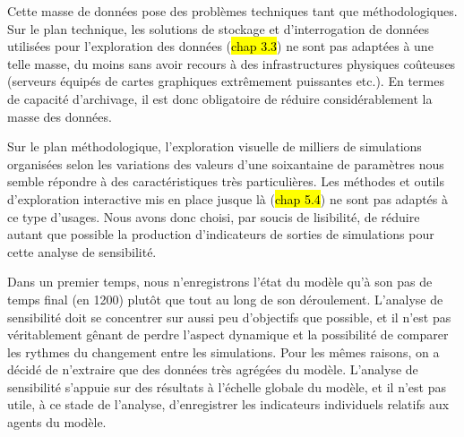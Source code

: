 Cette masse de données pose des problèmes techniques tant que méthodologiques.
Sur le plan technique, les solutions de stockage et d'interrogation de données utilisées pour l'exploration des données (\hl{chap 3.3}) ne sont pas adaptées à une telle masse, du moins sans avoir recours à des infrastructures physiques coûteuses (serveurs équipés de cartes graphiques extrêmement puissantes etc.).
En termes de capacité d'archivage, il est donc obligatoire de réduire considérablement la masse des données.

Sur le plan méthodologique, l'exploration visuelle de milliers de simulations organisées selon les variations des valeurs d'une soixantaine de paramètres nous semble répondre à des caractéristiques très particulières.
Les méthodes et outils d'exploration interactive mis en place jusque là (\hl{chap 5.4}) ne sont pas adaptés à ce type d'usages.
Nous avons donc choisi, par soucis de lisibilité, de réduire autant que possible la production d'indicateurs de sorties de simulations pour cette analyse de sensibilité.

Dans un premier temps, nous n'enregistrons l'état du modèle qu'à son pas de temps final (en 1200) plutôt que tout au long de son déroulement.
L'analyse de sensibilité doit se concentrer sur aussi peu d'objectifs que possible, et il n'est pas véritablement gênant de perdre l'aspect dynamique et la possibilité de comparer les rythmes du changement entre les simulations.
Pour les mêmes raisons, on a décidé de n'extraire que des données très agrégées du modèle.
L'analyse de sensibilité s'appuie sur des résultats à l'échelle globale du modèle, et il n'est pas utile, à ce stade de l'analyse, d'enregistrer les indicateurs individuels relatifs aux agents du modèle.

